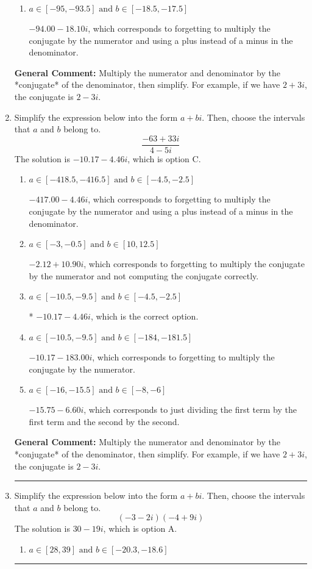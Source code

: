 \documentclass{extbook}[14pt]
\newcommand{\litem}[1]{\item #1

\rule{\textwidth}{0.4pt}}
\begin{document}
\begin{enumerate}
{\begin{enumerate}[label=\Alph*.]
 $17.30  + 7.10 i$, which corresponds to forgetting to multiply the conjugate by the numerator and not computing the conjugate correctly.
\item \( a \in [-95, -93.5] \text{ and } b \in [-18.5, -17.5] \)

 $-94.00  - 18.10 i$, which corresponds to forgetting to multiply the conjugate by the numerator and using a plus instead of a minus in the denominator.
\end{enumerate}

\textbf{General Comment:} Multiply the numerator and denominator by the *conjugate* of the denominator, then simplify. For example, if we have $2+3i$, the conjugate is $2-3i$.
}
\litem{
Simplify the expression below into the form $a+bi$. Then, choose the intervals that $a$ and $b$ belong to.
\[ \frac{-63 + 33 i}{4 - 5 i} \]The solution is \( -10.17  - 4.46 i \), which is option C.\begin{enumerate}[label=\Alph*.]
\item \( a \in [-418.5, -416.5] \text{ and } b \in [-4.5, -2.5] \)

 $-417.00  - 4.46 i$, which corresponds to forgetting to multiply the conjugate by the numerator and using a plus instead of a minus in the denominator.
\item \( a \in [-3, -0.5] \text{ and } b \in [10, 12.5] \)

 $-2.12  + 10.90 i$, which corresponds to forgetting to multiply the conjugate by the numerator and not computing the conjugate correctly.
\item \( a \in [-10.5, -9.5] \text{ and } b \in [-4.5, -2.5] \)

* $-10.17  - 4.46 i$, which is the correct option.
\item \( a \in [-10.5, -9.5] \text{ and } b \in [-184, -181.5] \)

 $-10.17  - 183.00 i$, which corresponds to forgetting to multiply the conjugate by the numerator.
\item \( a \in [-16, -15.5] \text{ and } b \in [-8, -6] \)

 $-15.75  - 6.60 i$, which corresponds to just dividing the first term by the first term and the second by the second.
\end{enumerate}

\textbf{General Comment:} Multiply the numerator and denominator by the *conjugate* of the denominator, then simplify. For example, if we have $2+3i$, the conjugate is $2-3i$.
}
\litem{
Simplify the expression below into the form $a+bi$. Then, choose the intervals that $a$ and $b$ belong to.
\[ (-3 - 2 i)(-4 + 9 i) \]The solution is \( 30 - 19 i \), which is option A.\begin{enumerate}[label=\Alph*.]
\item \( a \in [28, 39] \text{ and } b \in [-20.3, -18.6] \)


\end{enumerate}}
\end{enumerate}
\end{document}

